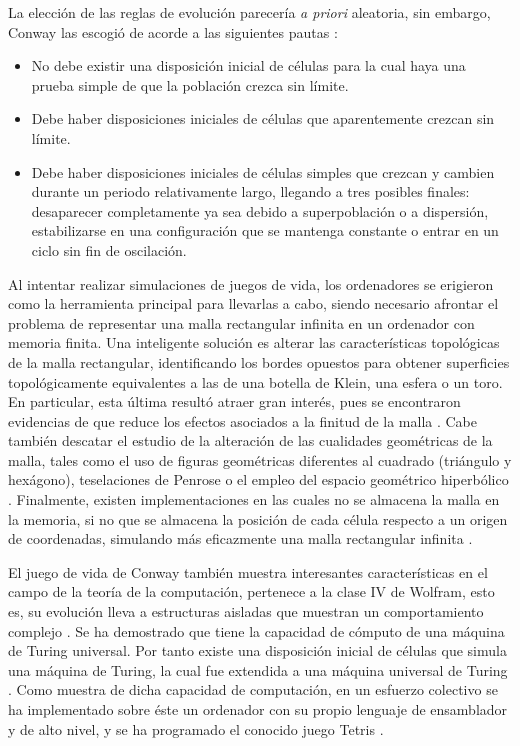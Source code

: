 \documentclass[../proyecto.tex]{book}
\begin{document}
La elección de las reglas de evolución parecería \textit{a priori} aleatoria, sin embargo, Conway las escogió de acorde a las siguientes pautas \cite{libroGardner}:
\begin{itemize}
	\item No debe existir una disposición inicial de células para la cual haya una prueba simple de que la población crezca sin límite.
	\item Debe haber disposiciones iniciales de células que aparentemente crezcan sin límite. 
	\item Debe haber disposiciones iniciales de células simples que crezcan y cambien durante un periodo relativamente largo, llegando a tres posibles finales: desaparecer completamente ya sea debido a superpoblación o a dispersión, estabilizarse en una configuración que se mantenga constante o entrar en un ciclo sin fin de oscilación.
\end{itemize}

Al intentar realizar simulaciones de juegos de vida, los ordenadores se erigieron como la herramienta principal para llevarlas a cabo, siendo necesario afrontar el problema de representar una malla rectangular infinita en un ordenador con memoria finita. Una inteligente solución es alterar las características topológicas de la malla rectangular, identificando los bordes opuestos para obtener superficies topológicamente equivalentes a las de una botella de Klein, una esfera o un toro. En particular, esta última resultó atraer gran interés, pues se encontraron evidencias de que reduce los efectos asociados a la finitud de la malla \cite{finitudMalla, finitudMalla2}. Cabe también descatar el estudio de la alteración de las cualidades geométricas de la malla, tales como el uso de figuras geométricas diferentes al cuadrado (triángulo y hexágono)\cite{triangular}, teselaciones de Penrose \cite{penrose} o el empleo del espacio geométrico hiperbólico \cite{hiperbolico}. Finalmente, existen implementaciones en las cuales no se almacena la malla en la memoria, si no que se almacena la posición de cada célula respecto a un origen de coordenadas, simulando más eficazmente una malla  rectangular infinita \cite{boardless}.

El juego de vida de Conway también muestra interesantes características en el campo de la teoría de la computación, pertenece a la clase IV de Wolfram, esto es, su evolución lleva a estructuras aisladas que muestran un comportamiento complejo \cite{ccuatro, ccuatro2}. Se ha demostrado que tiene la capacidad de cómputo de una máquina de Turing universal. Por tanto existe una disposición inicial de células que simula una máquina de Turing, la cual fue extendida a una máquina universal de Turing \cite{turingUniversal,turing}. Como muestra de dicha capacidad de computación, en un esfuerzo colectivo se ha implementado sobre éste un ordenador con su propio lenguaje de ensamblador y de alto nivel, y se ha programado el conocido juego Tetris \cite{tetris, logical}.
\end{document}
